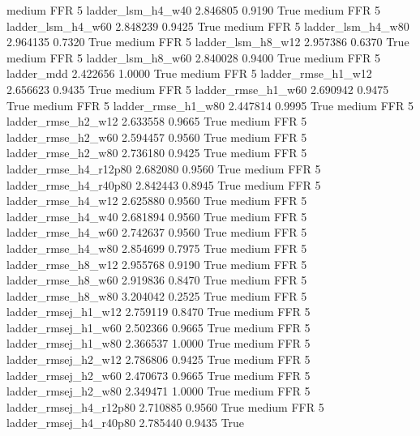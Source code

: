     medium      FFR                 5      ladder_lsm_h4_w40   2.846805      0.9190    True
    medium      FFR                 5      ladder_lsm_h4_w60   2.848239      0.9425    True
    medium      FFR                 5      ladder_lsm_h4_w80   2.964135      0.7320    True
    medium      FFR                 5      ladder_lsm_h8_w12   2.957386      0.6370    True
    medium      FFR                 5      ladder_lsm_h8_w60   2.840028      0.9400    True
    medium      FFR                 5             ladder_mdd   2.422656      1.0000    True
    medium      FFR                 5     ladder_rmse_h1_w12   2.656623      0.9435    True
    medium      FFR                 5     ladder_rmse_h1_w60   2.690942      0.9475    True
    medium      FFR                 5     ladder_rmse_h1_w80   2.447814      0.9995    True
    medium      FFR                 5     ladder_rmse_h2_w12   2.633558      0.9665    True
    medium      FFR                 5     ladder_rmse_h2_w60   2.594457      0.9560    True
    medium      FFR                 5     ladder_rmse_h2_w80   2.736180      0.9425    True
    medium      FFR                 5  ladder_rmse_h4_r12p80   2.682080      0.9560    True
    medium      FFR                 5  ladder_rmse_h4_r40p80   2.842443      0.8945    True
    medium      FFR                 5     ladder_rmse_h4_w12   2.625880      0.9560    True
    medium      FFR                 5     ladder_rmse_h4_w40   2.681894      0.9560    True
    medium      FFR                 5     ladder_rmse_h4_w60   2.742637      0.9560    True
    medium      FFR                 5     ladder_rmse_h4_w80   2.854699      0.7975    True
    medium      FFR                 5     ladder_rmse_h8_w12   2.955768      0.9190    True
    medium      FFR                 5     ladder_rmse_h8_w60   2.919836      0.8470    True
    medium      FFR                 5     ladder_rmse_h8_w80   3.204042      0.2525    True
    medium      FFR                 5    ladder_rmsej_h1_w12   2.759119      0.8470    True
    medium      FFR                 5    ladder_rmsej_h1_w60   2.502366      0.9665    True
    medium      FFR                 5    ladder_rmsej_h1_w80   2.366537      1.0000    True
    medium      FFR                 5    ladder_rmsej_h2_w12   2.786806      0.9425    True
    medium      FFR                 5    ladder_rmsej_h2_w60   2.470673      0.9665    True
    medium      FFR                 5    ladder_rmsej_h2_w80   2.349471      1.0000    True
    medium      FFR                 5 ladder_rmsej_h4_r12p80   2.710885      0.9560    True
    medium      FFR                 5 ladder_rmsej_h4_r40p80   2.785440      0.9435    True
